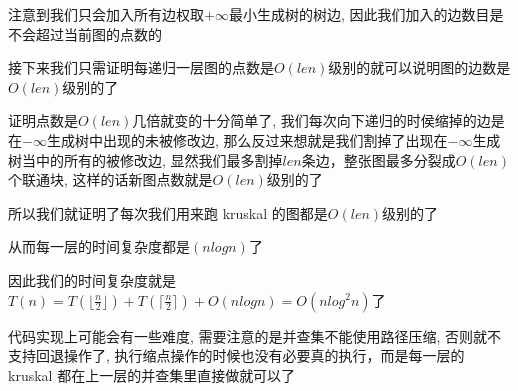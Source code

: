 注意到我们只会加入所有边权取$+\infty$最小生成树的树边, 因此我们加入的边数目是不会超过当前图的点数的

接下来我们只需证明每递归一层图的点数是$O(len)$级别的就可以说明图的边数是$O(len)$级别的了

证明点数是$O(len)$几倍就变的十分简单了, 我们每次向下递归的时侯缩掉的边是在$-\infty$生成树中出现的未被修改边, 那么反过来想就是我们割掉了出现在$-\infty$生成树当中的所有的被修改边, 显然我们最多割掉$len$条边，整张图最多分裂成$O(len)$个联通块, 这样的话新图点数就是$O(len)$级别的了

所以我们就证明了每次我们用来跑 kruskal 的图都是$O(len)$级别的了

从而每一层的时间复杂度都是$(nlogn)$了

因此我们的时间复杂度就是$T(n)=T(\lfloor \frac{n}{2} \rfloor)+T(\lceil \frac{n}{2} \rceil)+ O(nlogn)=O(nlog^2n)$了

代码实现上可能会有一些难度, 需要注意的是并查集不能使用路径压缩, 否则就不支持回退操作了, 执行缩点操作的时候也没有必要真的执行，而是每一层的 kruskal 都在上一层的并查集里直接做就可以了

